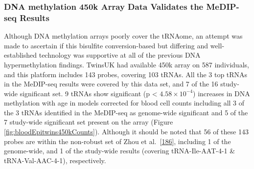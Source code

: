 \documentclass[
]{book}
\begin{document}
\hypertarget{dna-methylation-450k-array-data-validates-the-medip-seq-results}{%
\subsubsection{DNA methylation 450k Array Data Validates the MeDIP-seq Results}\label{dna-methylation-450k-array-data-validates-the-medip-seq-results}}

Although DNA methylation arrays poorly cover the tRNAome, an attempt was made to ascertain if this bisulfite conversion-based but differing and well-established technology was supportive at all of the previous DNA hypermethylation findings.
TwinsUK had available 450k array on 587 individuals, and this platform includes 143 probes, covering 103 tRNAs.
All the 3 top tRNAs in the MeDIP-seq results were covered by this data set, and 7 of the 16 study-wide significant set.
9 tRNAs show significant (p \textless{} \(4.58\times10^{-4}\)) increases in DNA methylation with age in models corrected for blood cell counts including all 3 of the 3 tRNAs identified in the MeDIP-seq as genome-wide significant and 5 of the 7 study-wide significant set present on the array (Figure \ref{fig:bloodEpitwins450kCounts}).
Although it should be noted that 56 of these 143 probes are within the non-robust set of Zhou et al.~{[}\protect\hyperlink{ref-Zhou2017}{186}{]}, including 1 of the genome-wide, and 1 of the study-wide results (covering tRNA-Ile-AAT-4-1 \& tRNA-Val-AAC-4-1), respectively.
\end{document}
